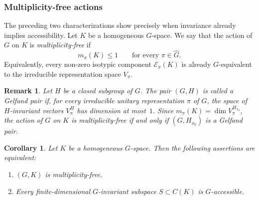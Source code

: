 \documentclass[11pt,showkeys]{amsart}
\newtheorem{remark}[theorem]{Remark}
\newtheorem{corollary}[theorem]{Corollary}
\begin{document}
\subsubsection{Multiplicity-free actions}
\label{sss:multiplicity-free}

The preceding two characterizations show precisely when invariance
already implies accessibility. Let \(K\) be a homogeneous \(G\)-space.
We say that the action of \(G\) on \(K\) is \emph{multiplicity-free} if
\[
        m_\pi(K)\leq 1
        \qquad
        \text{for every }\pi\in\widehat G .
\]
Equivalently, every non-zero isotypic component \(\mathcal E_\pi(K)\)
is already \(G\)-equivalent to the irreducible representation space
\(V_\pi\).



\begin{remark}
Let \(H\) be a closed subgroup of \(G\). The pair \((G,H)\) is called a
\emph{Gelfand pair} if, for every irreducible unitary representation
\(\pi\) of \(G\), the space of \(H\)-invariant vectors \(V_\pi^H\) has
dimension at most~\(1\). Since
\(
        m_\pi(K)=\dim V_\pi^{H_{x_0}},
\)
the action of \(G\) on \(K\) is multiplicity-free if and only if
\((G,H_{x_0})\) is a Gelfand pair.
\end{remark}

 
\begin{corollary}
\label{cor:gelfand-pairs}
Let \(K\) be a homogeneous \(G\)-space. Then the following assertions are
equivalent:
\begin{enumerate}
\item \((G,K)\) is multiplicity-free.
\item Every finite-dimensional \(G\)-invariant subspace
      \(S\subset C(K)\) is \(G\)-accessible.
\end{enumerate}
\end{corollary}
\end{document}

